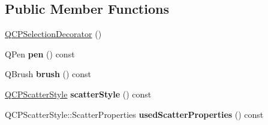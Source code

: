 \subsection*{Public Member Functions}
\begin{DoxyCompactItemize}
\item 
\hyperlink{classQCPSelectionDecorator_aa145480d9a062cd176fe30900bb7bca8}{Q\+C\+P\+Selection\+Decorator} ()
\item 
Q\+Pen {\bfseries pen} () const \hypertarget{classQCPSelectionDecorator_a8365eaa0543756dd6758efa32fbe8041}{}\label{classQCPSelectionDecorator_a8365eaa0543756dd6758efa32fbe8041}

\item 
Q\+Brush {\bfseries brush} () const \hypertarget{classQCPSelectionDecorator_a661b4703ebd3115dc4b07810dd148b20}{}\label{classQCPSelectionDecorator_a661b4703ebd3115dc4b07810dd148b20}

\item 
\hyperlink{classQCPScatterStyle}{Q\+C\+P\+Scatter\+Style} {\bfseries scatter\+Style} () const \hypertarget{classQCPSelectionDecorator_a347df79afebbfd5b5a2c9143214ee5b9}{}\label{classQCPSelectionDecorator_a347df79afebbfd5b5a2c9143214ee5b9}

\item 
Q\+C\+P\+Scatter\+Style\+::\+Scatter\+Properties {\bfseries used\+Scatter\+Properties} () const \hypertarget{classQCPSelectionDecorator_ab82ebdb4915fa7f5c1b253e23e780b13}{}\label{classQCPSelectionDecorator_ab82ebdb4915fa7f5c1b253e23e780b13}


\end{DoxyCompactItemize}
